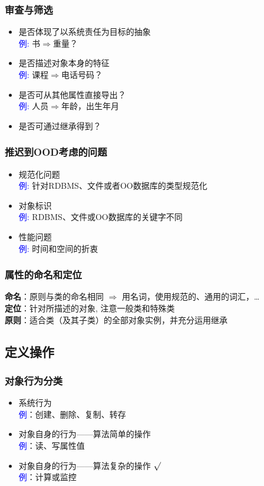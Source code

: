 \documentclass[compress]{beamer}
\begin{document}
\begin{frame}
  \frametitle{审查与筛选}
  \begin{itemize}
    \item 是否体现了以系统责任为目标的抽象 \\
      \textcolor{blue}{例:} 书$\Rightarrow$重量？
    \item 是否描述对象本身的特征 \\
      \textcolor{blue}{例:} 课程$\Rightarrow$电话号码？
    \item 是否可从其他属性直接导出？ \\
      \textcolor{blue}{例:} 人员$\Rightarrow$年龄，出生年月 
    \item 是否可通过继承得到？
  \end{itemize}
\end{frame}

\begin{frame}
  \frametitle{推迟到OOD考虑的问题}
  \begin{itemize}
    \item 规范化问题 \\
      \textcolor{blue}{例:} 针对RDBMS、文件或者OO数据库的类型规范化
    \item 对象标识 \\
      \textcolor{blue}{例:} RDBMS、文件或OO数据库的关键字不同
    \item 性能问题 \\
      \textcolor{blue}{例:} 时间和空间的折衷

  \end{itemize}
\end{frame}

\begin{frame}
  \frametitle{属性的命名和定位}

  \textbf{命名}：原则与类的命名相同 $\Rightarrow$  
  用名词，使用规范的、通用的词汇，\ldots  \\
  \textbf{定位}：针对所描述的对象, 注意一般类和特殊类 \\
  \textbf{原则}：适合类（及其子类）的全部对象实例，并充分运用继承
\end{frame}

\subsection{定义操作}

\begin{frame}
  \frametitle{对象行为分类}
  \begin{itemize}
    \item 系统行为 \\
      \textcolor{blue}{例}：创建、删除、复制、转存
    \item 对象自身的行为——算法简单的操作 \\
      \textcolor{blue}{例}：读、写属性值
    \item 对象自身的行为——算法复杂的操作 $\surd$\\
      \textcolor{blue}{例}：计算或监控
  \end{itemize}
\end{frame}
\end{document}
